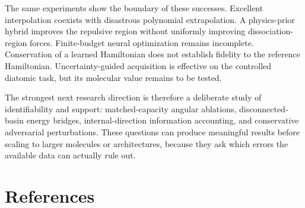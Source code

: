 \documentclass[
  11pt,
  a4paper,
]{article}
\begin{document}
The same experiments show the boundary of these successes. Excellent
interpolation coexists with disastrous polynomial extrapolation. A
physics-prior hybrid improves the repulsive region without uniformly
improving dissociation-region forces. Finite-budget neural optimization
remains incomplete. Conservation of a learned Hamiltonian does not
establish fidelity to the reference Hamiltonian. Uncertainty-guided
acquisition is effective on the controlled diatomic task, but its
molecular value remains to be tested.

The strongest next research direction is therefore a deliberate study of
identifiability and support: matched-capacity angular ablations,
disconnected-basin energy bridges, internal-direction information
accounting, and conservative adversarial perturbations. These questions
can produce meaningful results before scaling to larger molecules or
architectures, because they ask which errors the available data can
actually rule out.

\hypertarget{references}{%
\section{References}\label{references}}
\end{document}
